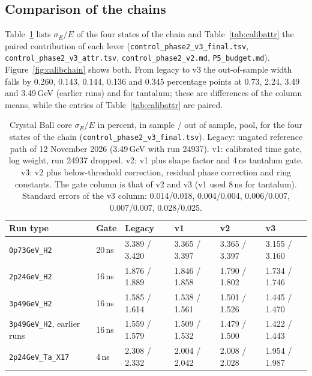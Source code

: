 \documentclass[11pt]{article}
\newcommand{\code}[1]{\texttt{#1}}
\begin{document}
\subsection{Comparison of the chains}\label{sec:calibcomp}

Table~\ref{tab:calibchains} lists $\sigma_E/E$ of the four states of the chain and Table~\ref{tab:calibattr} the paired contribution of each lever (\code{control\_phase2\_v3\_final.tsv}, \code{control\_phase2\_v3\_attr.tsv}, \code{control\_phase2\_v2.md}, \code{P5\_budget.md}). Figure~\ref{fig:calibchain} shows both. From legacy to v3 the out-of-sample width falls by 0.260, 0.143, 0.144, 0.136 and 0.345 percentage points at 0.73, 2.24, 3.49 and 3.49\,GeV (earlier runs) and for tantalum; these are differences of the column means, while the entries of Table~\ref{tab:calibattr} are paired.

\begin{table}[htbp]
\centering
\caption{Crystal Ball core $\sigma_E/E$ in percent, in sample / out of sample, pool, for the four states of the chain (\code{control\_phase2\_v3\_final.tsv}). Legacy: ungated reference path of 12 November 2026 (3.49\,GeV with run 24937). v1: calibrated time gate, log weight, run 24937 dropped. v2: v1 plus shape factor and 4\,ns tantalum gate. v3: v2 plus below-threshold correction, residual phase correction and ring constants. The gate column is that of v2 and v3 (v1 used 8\,ns for tantalum). Standard errors of the v3 column: 0.014/0.018, 0.004/0.004, 0.006/0.007, 0.007/0.007, 0.028/0.025.}
\label{tab:calibchains}
\small
\begin{tabular}{llllll}
\toprule
Run type & Gate & Legacy & v1 & v2 & v3 \\
\midrule
\code{0p73GeV\_H2} & 20\,ns & 3.389 / 3.420 & 3.365 / 3.397 & 3.365 / 3.397 & 3.155 / 3.160 \\
\code{2p24GeV\_H2} & 16\,ns & 1.876 / 1.889 & 1.846 / 1.858 & 1.790 / 1.802 & 1.734 / 1.746 \\
\code{3p49GeV\_H2} & 16\,ns & 1.585 / 1.614 & 1.538 / 1.561 & 1.501 / 1.526 & 1.445 / 1.470 \\
\code{3p49GeV\_H2}, earlier runs & 16\,ns & 1.559 / 1.579 & 1.509 / 1.532 & 1.479 / 1.500 & 1.422 / 1.443 \\
\code{2p24GeV\_Ta\_X17} & 4\,ns & 2.308 / 2.332 & 2.004 / 2.042 & 2.008 / 2.028 & 1.954 / 1.987 \\
\bottomrule
\end{tabular}
\end{table}
\end{document}
